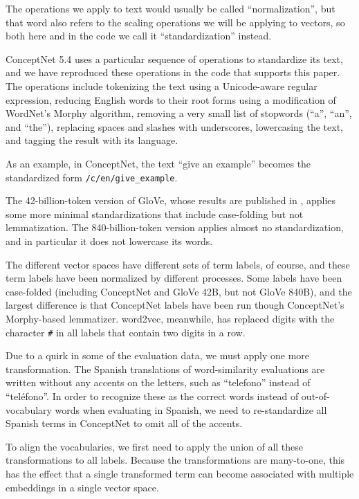 \documentclass[11pt,letterpaper]{article}
\begin{document}
The operations we apply to text would usually be called ``normalization'',
but that word also refers to the scaling operations we will be applying to
vectors, so both here and in the code we call it ``standardization'' instead.

ConceptNet 5.4 uses a particular sequence of operations to standardize its
text, and we have reproduced these operations in the code that supports this
paper.  The operations include tokenizing the text using a Unicode-aware
regular expression, reducing English words to their root forms using a
modification of WordNet's Morphy algorithm, removing a very small list of
stopwords (``a'', ``an'', and ``the''), replacing spaces and slashes with
underscores, lowercasing the text, and tagging the result with its language.

As an example, in ConceptNet, the text ``give an example'' becomes the
standardized form {\tt /c/en/give\_example}.

The 42-billion-token version of GloVe, whose results are published in
\cite{pennington2014glove}, applies some more minimal standardizations that
include case-folding but not lemmatization. The 840-billion-token version
applies almost no standardization, and in particular it does not lowercase its
words.

The different vector spaces have different sets of term labels, of course, and
these term labels have been normalized by different processes. Some labels
have been case-folded (including ConceptNet and GloVe 42B, but not GloVe 840B),
and the largest difference is that ConceptNet labels have been run though
ConceptNet's Morphy-based lemmatizer. word2vec, meanwhile, has replaced digits
with the character {\tt #} in all labels that contain two digits in a row.

Due to a quirk in some of the evaluation data, we must apply one more
transformation. The Spanish translations of word-similarity evaluations
\cite{hassan2009crosslingual} are written without any accents on the letters,
such as ``telefono'' instead of ``tel\'{e}fono''. In order to recognize these as
the correct words instead of out-of-vocabulary words when evaluating in Spanish,
we need to re-standardize all Spanish terms in ConceptNet to omit all of the
accents.

To align the vocabularies, we first need to apply the union of all these
transformations to all labels. Because the transformations are many-to-one, this
has the effect that a single transformed term can become associated with
multiple embeddings in a single vector space.
\end{document}
